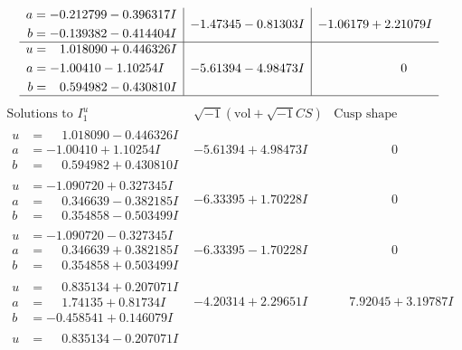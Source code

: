 \documentclass[1p]{elsarticle_modified}
\theoremstyle{definition}
\newcommand{\I}{\sqrt{-1}}
\begin{document}
$$\begin{array}{c|c|c}
\begin{aligned}
a &= -0.212799 - 0.396317 I \\
b &= -0.139382 - 0.414404 I\end{aligned}
 & -1.47345 - 0.81303 I & -1.06179 + 2.21079 I \\ \hline\begin{aligned}
u &= \phantom{-}1.018090 + 0.446326 I \\
a &= -1.00410 - 1.10254 I \\
b &= \phantom{-}0.594982 - 0.430810 I\end{aligned}
 & -5.61394 - 4.98473 I & \phantom{-0.000000 } 0\\
 \hline 
 \end{array}$$\newpage$$\begin{array}{c|c|c}  
\text{Solutions to }I^u_{1}& \I (\text{vol} + \sqrt{-1}CS) & \text{Cusp shape}\\
 \hline 
\begin{aligned}
u &= \phantom{-}1.018090 - 0.446326 I \\
a &= -1.00410 + 1.10254 I \\
b &= \phantom{-}0.594982 + 0.430810 I\end{aligned}
 & -5.61394 + 4.98473 I & \phantom{-0.000000 } 0 \\ \hline\begin{aligned}
u &= -1.090720 + 0.327345 I \\
a &= \phantom{-}0.346639 - 0.382185 I \\
b &= \phantom{-}0.354858 - 0.503499 I\end{aligned}
 & -6.33395 + 1.70228 I & \phantom{-0.000000 } 0 \\ \hline\begin{aligned}
u &= -1.090720 - 0.327345 I \\
a &= \phantom{-}0.346639 + 0.382185 I \\
b &= \phantom{-}0.354858 + 0.503499 I\end{aligned}
 & -6.33395 - 1.70228 I & \phantom{-0.000000 } 0 \\ \hline\begin{aligned}
u &= \phantom{-}0.835134 + 0.207071 I \\
a &= \phantom{-}1.74135 + 0.81734 I \\
b &= -0.458541 + 0.146079 I\end{aligned}
 & -4.20314 + 2.29651 I & \phantom{-}7.92045 + 3.19787 I \\ \hline\begin{aligned}
u &= \phantom{-}0.835134 - 0.207071 I \\

\end{aligned}
\end{array}$$
\end{document}
